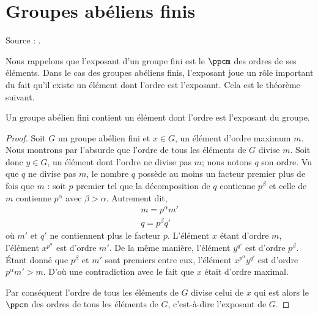 
\section{Groupes abéliens finis}

Source : \cite{FabricegPSFinis}.

Nous rappelons que l'exposant d'un groupe fini est le \( \ppcm\) des ordres de ses éléments. Dans le cas des groupes abéliens finis, l'exposant joue un rôle important du fait qu'il existe un élément dont l'ordre est l'exposant. Cela est le théorème suivant.

\begin{theorem}
    Un groupe abélien fini contient un élément dont l'ordre est l'exposant du groupe.
\end{theorem}

\begin{proof}
    Soit \( G\) un groupe abélien fini et \( x\in G\), un élément d'ordre maximum \( m\). Nous montrons par l'absurde que l'ordre de tous les éléments de \( G\) divise \( m\). Soit donc \( y\in G\), un élément dont l'ordre ne divise pas \( m\); nous notons $q$ son ordre. Vu que \( q\) ne divise pas \( m\), le nombre \( q\) possède au moins un facteur premier plus de fois que \( m\) : soit \( p\) premier tel que la décomposition de \( q\) contienne \( p^{\beta}\) et celle de \( m\) contienne \( p^{\alpha}\) avec \( \beta>\alpha\). Autrement dit,
    \begin{subequations}
        \begin{align}
            m=p^{\alpha}m'\\
            q=p^{\beta}q'
        \end{align}
    \end{subequations}
    où \( m'\) et \( q'\) ne contiennent plus le facteur \( p\). L'élément \( x\) étant d'ordre \( m\), l'élément \( x^{p^{\alpha}}\) est d'ordre \( m'\). De la même manière, l'élément \( y^{q'}\) est d'ordre \( p^{\beta}\). Étant donné que \( p^{\beta}\) et \( m'\) sont premiers entre eux, l'élément  \( x^{p^{\alpha}}y^{q'}\) est d'ordre \( p^{\alpha}m'>m\). D'où une contradiction avec le fait que \( x\) était d'ordre maximal.

    Par conséquent l'ordre de tous les éléments de $G$ divise celui de \( x\) qui est alors le \( \ppcm\) des ordres de tous les éléments de \( G\), c'est-à-dire l'exposant de \( G\).
\end{proof}

